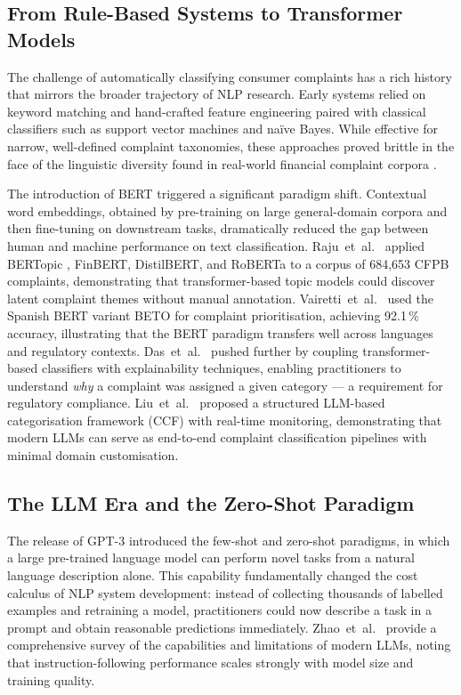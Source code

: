 \documentclass[journal]{IEEEtran}
\begin{document}
\subsection{From Rule-Based Systems to Transformer Models}

The challenge of automatically classifying consumer complaints has a
rich history that mirrors the broader trajectory of NLP research. Early
systems relied on keyword matching and hand-crafted feature engineering
paired with classical classifiers such as support vector machines and
na{\"i}ve Bayes. While effective for narrow, well-defined complaint
taxonomies, these approaches proved brittle in the face of the
linguistic diversity found in real-world financial complaint corpora
\cite{raju2022bertopic,jondhale2024cfpb}.

The introduction of BERT \cite{devlin2019bert} triggered a significant
paradigm shift. Contextual word embeddings, obtained by pre-training on
large general-domain corpora and then fine-tuning on downstream tasks,
dramatically reduced the gap between human and machine performance on
text classification. Raju~et~al.\ \cite{raju2022bertopic} applied
BERTopic \cite{grootendorst2020bertopic}, FinBERT, DistilBERT, and
RoBERTa to a corpus of 684,653 CFPB complaints, demonstrating that
transformer-based topic models could discover latent complaint themes
without manual annotation. Vairetti~et~al.\ \cite{vairetti2024bert}
used the Spanish BERT variant BETO for complaint prioritisation,
achieving 92.1\,\% accuracy, illustrating that the BERT paradigm
transfers well across languages and regulatory contexts. Das~et~al.\
\cite{das2024explainable} pushed further by coupling transformer-based
classifiers with explainability techniques, enabling practitioners to
understand \emph{why} a complaint was assigned a given category — a
requirement for regulatory compliance. Liu~et~al.\ \cite{liu2024framework}
proposed a structured LLM-based categorisation framework (CCF) with
real-time monitoring, demonstrating that modern LLMs can serve as
end-to-end complaint classification pipelines with minimal domain
customisation.

\subsection{The LLM Era and the Zero-Shot Paradigm}

The release of GPT-3 \cite{brown2020gpt3} introduced the few-shot and
zero-shot paradigms, in which a large pre-trained language model can
perform novel tasks from a natural language description alone. This
capability fundamentally changed the cost calculus of NLP system
development: instead of collecting thousands of labelled examples and
retraining a model, practitioners could now describe a task in a
prompt and obtain reasonable predictions immediately. Zhao~et~al.\
\cite{zhao2023survey} provide a comprehensive survey of the capabilities
and limitations of modern LLMs, noting that instruction-following
performance scales strongly with model size and training quality.
\end{document}
